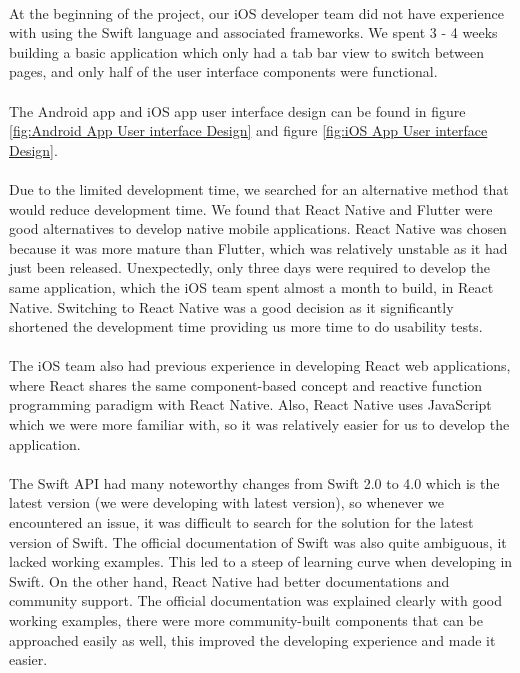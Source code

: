 \documentclass[12pt,a4paper]{article}
\begin{document}
        \paragraph{} At the beginning of the project, our iOS developer team did not have experience with using the Swift language and associated frameworks. We spent 3 - 4 weeks building a basic application which only had a tab bar view to switch between pages, and only half of the user interface components were functional. 

        \paragraph{} The Android app and iOS app user interface design can be found in figure \ref{fig:Android App User interface Design} and figure \ref{fig:iOS App User interface Design}.
        
        \paragraph{} Due to the limited development time, we searched for an alternative method that would reduce development time. We found that React Native and Flutter were good alternatives to develop native mobile applications. React Native was chosen because it was more mature than Flutter, which was relatively unstable as it had just been released. Unexpectedly, only three days were required to develop the same application, which the iOS team spent almost a month to build, in React Native. Switching to React Native was a good decision as it significantly shortened the development time providing us more time to do usability tests.
        
        \paragraph{} The iOS team also had previous experience in developing React web applications, where React shares the same component-based concept and reactive function programming paradigm with React Native. Also, React Native uses JavaScript which we were more familiar with, so it was relatively easier for us to develop the application.
        
        \paragraph{} The Swift API had many noteworthy changes from Swift 2.0 to 4.0 which is the latest version (we were developing with latest version), so whenever we encountered an issue, it was difficult to search for the solution for the latest version of Swift. The official documentation of Swift was also quite ambiguous, it lacked working examples. This led to a steep of learning curve when developing in Swift. On the other hand, React Native had better documentations and community support. The official documentation was explained clearly with good working examples, there were more community-built components that can be approached easily as well, this improved the developing experience and made it easier.
        
\end{document}
